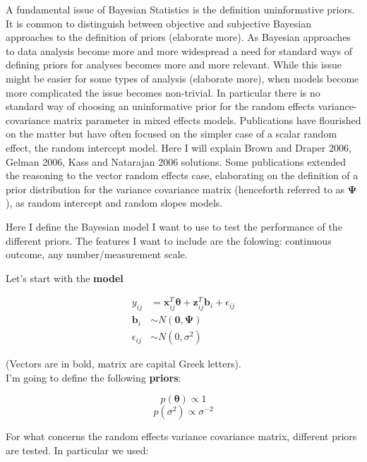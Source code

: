 \documentclass[a4paper]{article}
\begin{document}
A fundamental issue of Bayesian Statistics is the definition uninformative priors. It is common to distinguish between objective and subjective Bayesian approaches to the definition of priors (elaborate more). As Bayesian approaches to data analysis become more and more widespread a need for standard ways of defining priors for analyses becomes more and more relevant. While this issue might be easier for some types of analysis (elaborate more), when models become more complicated the issue becomes non-trivial. In particular there is no standard way of choosing an uninformative prior for the random effects variance-covariance matrix parameter in mixed effects models.
Publications have flourished on the matter but have often focused on the simpler case of a scalar random effect, the random intercept model. Here I will explain Brown and Draper 2006, Gelman 2006, Kass and Natarajan 2006 solutions.
Some publications extended the reasoning to the vector random effects case, elaborating on the definition of a prior distribution for the variance covariance matrix (henceforth referred to as $\bm{\Psi}$), as random intercept and random slopes models.

Here I define the Bayesian model I want to use to test the performance of the different priors. The features I want to include are the folowing: continuous outcome, any number/measurement scale.

Let's start with the \textbf{model}

\begin{equation}
 \begin{split}
	y_{ij}& = \bm{x}^{T}_{ij} \bm{\theta} + \bm{z}^{T}_{ij}\bm{b}_i + \epsilon_{ij}\\
	\bm{b}_i& \sim N(\bm{0}, \bm{\Psi})\\
	\epsilon_{ij}& \sim N(0, \sigma^2)
 \end{split}
\end{equation}

(Vectors are in bold, matrix are capital Greek letters).\\
I'm going to define the following \textbf{priors}:

\begin{equation}
p(\bm{\theta}) \propto 1
\end{equation}
\begin{equation}
p(\sigma^2) \propto \sigma^{-2}
\end{equation}

For what concerns the random effects variance covariance matrix, different priors are tested. In particular we used:
\end{document}
